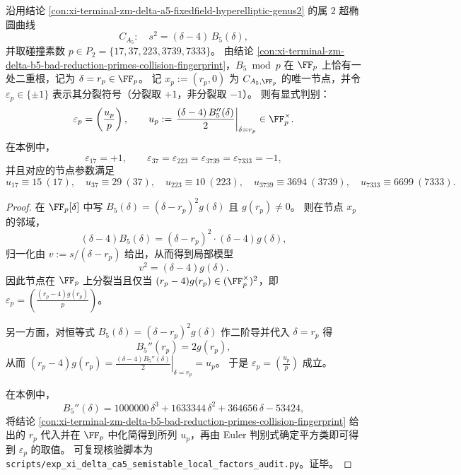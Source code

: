 \begin{proposition}[碰撞素数处节点分裂符号的二次特征判别]\label{prop:xi-terminal-zm-delta-ca5-collision-node-splitting-legendre}
沿用结论 \ref{con:xi-terminal-zm-delta-a5-fixedfield-hyperelliptic-genus2} 的属 \(2\) 超椭圆曲线
\[
C_{A_5}:\quad s^2=(\delta-4)\,B_5(\delta),
\]
并取碰撞素数 \(p\in P_2=\{17,37,223,3739,7333\}\)。
由结论 \ref{con:xi-terminal-zm-delta-b5-bad-reduction-primes-collision-fingerprint}，\(B_5\bmod p\) 在 \(\FF_p\) 上恰有一处二重根，记为 \(\delta=r_p\in\FF_p\)。
记 \(x_p:=(r_p,0)\) 为 \(C_{A_5,\FF_p}\) 的唯一节点，并令 \(\varepsilon_p\in\{\pm 1\}\) 表示其分裂符号（分裂取 \(+1\)，非分裂取 \(-1\)）。
则有显式判别：
\[
\varepsilon_p=\left(\frac{u_p}{p}\right),
\qquad
u_p:=\left.\frac{(\delta-4)\,B_5''(\delta)}{2}\right|_{\delta=r_p}\in\FF_p^\times.
\]
在本例中，
\[
\varepsilon_{17}=+1,\qquad
\varepsilon_{37}=\varepsilon_{223}=\varepsilon_{3739}=\varepsilon_{7333}=-1,
\]
并且对应的节点参数满足
\[
u_{17}\equiv 15\ (17),\quad
u_{37}\equiv 29\ (37),\quad
u_{223}\equiv 10\ (223),\quad
u_{3739}\equiv 3694\ (3739),\quad
u_{7333}\equiv 6699\ (7333).
\]
\end{proposition}
\begin{proof}
在 \(\FF_p[\delta]\) 中写
\(
B_5(\delta)=(\delta-r_p)^2 g(\delta)
\)
且 \(g(r_p)\neq 0\)。
则在节点 \(x_p\) 的邻域，
\[
(\delta-4)B_5(\delta)=(\delta-r_p)^2\cdot (\delta-4)g(\delta),
\]
归一化由 \(v:=s/(\delta-r_p)\) 给出，从而得到局部模型
\[
v^2=(\delta-4)g(\delta).
\]
因此节点在 \(\FF_p\) 上分裂当且仅当 \((r_p-4)g(r_p)\in(\FF_p^\times)^2\)，即
\(
\varepsilon_p=\left(\frac{(r_p-4)g(r_p)}{p}\right)
\)。
\par
另一方面，对恒等式 \(B_5(\delta)=(\delta-r_p)^2g(\delta)\) 作二阶导并代入 \(\delta=r_p\) 得
\[
B_5''(r_p)=2g(r_p),
\]
从而
\(
(r_p-4)g(r_p)=\left.\frac{(\delta-4)B_5''(\delta)}{2}\right|_{\delta=r_p}=u_p
\)。
于是 \(\varepsilon_p=\left(\frac{u_p}{p}\right)\) 成立。
\par
在本例中，
\[
B_5''(\delta)=1000000\,\delta^3+1633344\,\delta^2+364656\,\delta-53424,
\]
将结论 \ref{con:xi-terminal-zm-delta-b5-bad-reduction-primes-collision-fingerprint} 给出的 \(r_p\) 代入并在 \(\FF_p\) 中化简得到所列 \(u_p\)，再由 Euler 判别式确定平方类即可得到 \(\varepsilon_p\) 的取值。
可复现核验脚本为 \texttt{scripts/exp\_xi\_delta\_ca5\_semistable\_local\_factors\_audit.py}。证毕。
\end{proof}


